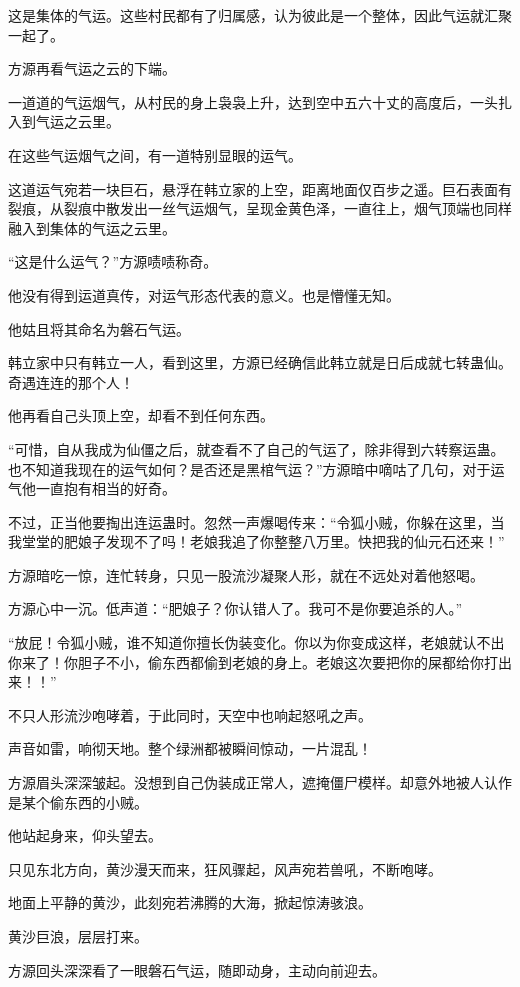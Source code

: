\begin{this_body}
这是集体的气运。这些村民都有了归属感，认为彼此是一个整体，因此气运就汇聚一起了。

方源再看气运之云的下端。

一道道的气运烟气，从村民的身上袅袅上升，达到空中五六十丈的高度后，一头扎入到气运之云里。

在这些气运烟气之间，有一道特别显眼的运气。

这道运气宛若一块巨石，悬浮在韩立家的上空，距离地面仅百步之遥。巨石表面有裂痕，从裂痕中散发出一丝气运烟气，呈现金黄色泽，一直往上，烟气顶端也同样融入到集体的气运之云里。

“这是什么运气？”方源啧啧称奇。

他没有得到运道真传，对运气形态代表的意义。也是懵懂无知。

他姑且将其命名为磐石气运。

韩立家中只有韩立一人，看到这里，方源已经确信此韩立就是日后成就七转蛊仙。奇遇连连的那个人！

他再看自己头顶上空，却看不到任何东西。

“可惜，自从我成为仙僵之后，就查看不了自己的气运了，除非得到六转察运蛊。也不知道我现在的运气如何？是否还是黑棺气运？”方源暗中嘀咕了几句，对于运气他一直抱有相当的好奇。

不过，正当他要掏出连运蛊时。忽然一声爆喝传来：“令狐小贼，你躲在这里，当我堂堂的肥娘子发现不了吗！老娘我追了你整整八万里。快把我的仙元石还来！”

方源暗吃一惊，连忙转身，只见一股流沙凝聚人形，就在不远处对着他怒喝。

方源心中一沉。低声道：“肥娘子？你认错人了。我可不是你要追杀的人。”

“放屁！令狐小贼，谁不知道你擅长伪装变化。你以为你变成这样，老娘就认不出你来了！你胆子不小，偷东西都偷到老娘的身上。老娘这次要把你的屎都给你打出来！！”

不只人形流沙咆哮着，于此同时，天空中也响起怒吼之声。

声音如雷，响彻天地。整个绿洲都被瞬间惊动，一片混乱！

方源眉头深深皱起。没想到自己伪装成正常人，遮掩僵尸模样。却意外地被人认作是某个偷东西的小贼。

他站起身来，仰头望去。

只见东北方向，黄沙漫天而来，狂风骤起，风声宛若兽吼，不断咆哮。

地面上平静的黄沙，此刻宛若沸腾的大海，掀起惊涛骇浪。

黄沙巨浪，层层打来。

方源回头深深看了一眼磐石气运，随即动身，主动向前迎去。


\end{this_body}
